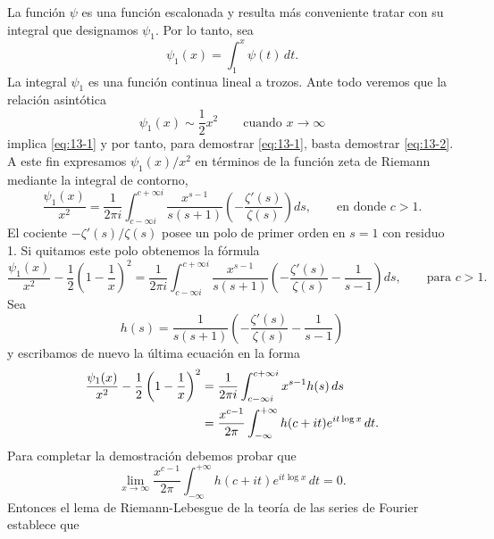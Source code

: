     La función $\psi$ es una función escalonada y resulta más conveniente tratar con su
    integral que designamos $\psi_1$. Por lo tanto, sea
    \begin{equation*}
        \psi_1(x)=\int_1^x\psi(t)\,dt.
    \end{equation*}
    La integral $\psi_1$ es una función continua lineal a trozos. Ante todo veremos que la
    relación asintótica
    \begin{equation}\label{eq:13-2}
        \psi_1(x)\sim\frac{1}{2}x^2\qquad\text{cuando }x\to\infty
    \end{equation}
    implica \eqref{eq:13-1} y por tanto, para demostrar \eqref{eq:13-1}, basta demostrar \eqref{eq:13-2}. A este fin expresamos
    $\psi_1(x)/x^2$ en términos de la función zeta de Riemann mediante la integral de
    contorno,
    \begin{equation*}
        \frac{\psi_1(x)}{x^2}=\frac{1}{2\pi i}\int_{c-\infty i}^{c+\infty i}\frac{x^{s-1}}{s(s+1)}\left(-\frac{\zeta'(s)}{\zeta(s)}\right)ds,\qquad\text{en donde }c>1.
    \end{equation*}
    El cociente $-\zeta'(s)/\zeta(s)$ posee un polo de primer orden en $s=1$ con residuo 1. Si
    quitamos este polo obtenemos la fórmula
    \begin{equation*}
        \frac{\psi_1(x)}{x^2}-\frac{1}{2}\left(1-\frac{1}{x}\right)^2=\frac{1}{2\pi i}\int_{c-\infty i}^{c+\infty i}\frac{x^{s-1}}{s(s+1)}\left(-\frac{\zeta'(s)}{\zeta(s)}-\frac{1}{s-1}\right)ds,\qquad\text{para }c>1.
    \end{equation*}
    Sea
    \begin{equation*}
        h(s)=\frac{1}{s(s+1)}\left(-\frac{\zeta'(s)}{\zeta(s)}-\frac{1}{s-1}\right)
    \end{equation*}
    y escribamos de nuevo la última ecuación en la forma
    \begin{align}
        \frac{\psi_1(x)}{x^2}-\frac{1}{2}\left(1-\frac{1}{x}\right)^2&=\frac{1}{2\pi i}\int_{c-\infty i}^{c+\infty i}x^{s-1}h(s)\,ds\notag\\
        &=\frac{x^{c-1}}{2\pi}\int_{-\infty}^{+\infty}h(c+it)e^{it\log x}\,dt.\label{eq:13-3}
    \end{align}
    Para completar la demostración debemos probar que
    \begin{equation}\label{eq:13-4}
        \lim_{x\to\infty}\frac{x^{c-1}}{2\pi}\int_{-\infty}^{+\infty}h(c+it)e^{it\log x}\,dt=0.
    \end{equation}
    Entonces el lema de Riemann-Lebesgue de la teoría de las series de Fourier establece que
